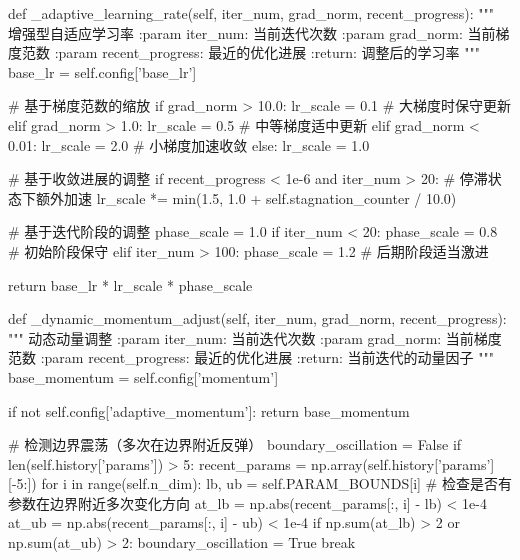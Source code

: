 \documentclass[a4paper,12pt]{article}
\begin{document}
\begin{python}
    def _adaptive_learning_rate(self, iter_num, grad_norm, recent_progress):
        """
        增强型自适应学习率
        :param iter_num: 当前迭代次数
        :param grad_norm: 当前梯度范数
        :param recent_progress: 最近的优化进展
        :return: 调整后的学习率
        """
        base_lr = self.config['base_lr']
        
        # 基于梯度范数的缩放
        if grad_norm > 10.0:
            lr_scale = 0.1  # 大梯度时保守更新
        elif grad_norm > 1.0:
            lr_scale = 0.5  # 中等梯度适中更新
        elif grad_norm < 0.01:
            lr_scale = 2.0  # 小梯度加速收敛
        else:
            lr_scale = 1.0
            
        # 基于收敛进展的调整
        if recent_progress < 1e-6 and iter_num > 20:
            # 停滞状态下额外加速
            lr_scale *= min(1.5, 1.0 + self.stagnation_counter / 10.0)
            
        # 基于迭代阶段的调整
        phase_scale = 1.0
        if iter_num < 20:
            phase_scale = 0.8  # 初始阶段保守
        elif iter_num > 100:
            phase_scale = 1.2  # 后期阶段适当激进
            
        return base_lr * lr_scale * phase_scale

    def _dynamic_momentum_adjust(self, iter_num, grad_norm, recent_progress):
        """
        动态动量调整
        :param iter_num: 当前迭代次数
        :param grad_norm: 当前梯度范数
        :param recent_progress: 最近的优化进展
        :return: 当前迭代的动量因子
        """
        base_momentum = self.config['momentum']
        
        if not self.config['adaptive_momentum']:
            return base_momentum
            
        # 检测边界震荡（多次在边界附近反弹）
        boundary_oscillation = False
        if len(self.history['params']) > 5:
            recent_params = np.array(self.history['params'][-5:])
            for i in range(self.n_dim):
                lb, ub = self.PARAM_BOUNDS[i]
                # 检查是否有参数在边界附近多次变化方向
                at_lb = np.abs(recent_params[:, i] - lb) < 1e-4
                at_ub = np.abs(recent_params[:, i] - ub) < 1e-4
                if np.sum(at_lb) > 2 or np.sum(at_ub) > 2:
                    boundary_oscillation = True
                    break
        

\end{python}
\end{document}
